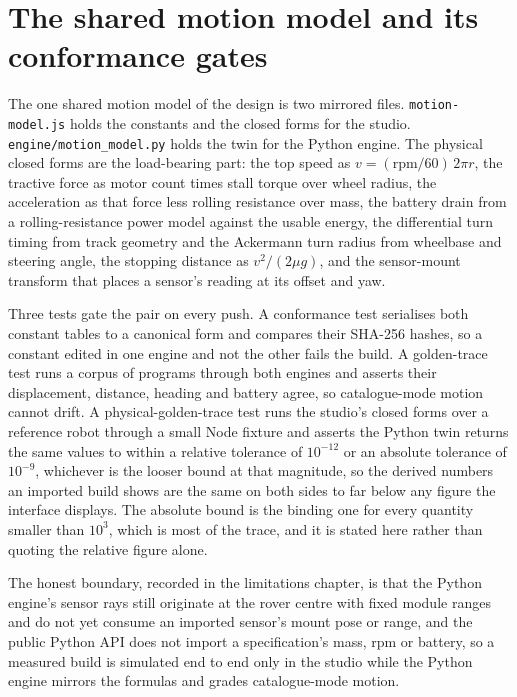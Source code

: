 \documentclass[11pt,a4paper]{report}
\begin{document}
\section{The shared motion model and its conformance gates}
\label{sec:conformance}
The one shared motion model of the design is two mirrored files. \texttt{motion-model.js} holds the constants and the closed forms for the studio. \texttt{engine/motion\_model.py} holds the twin for the Python engine. The physical closed forms are the load-bearing part: the top speed as $v = (\mathrm{rpm}/60)\,2\pi r$, the tractive force as motor count times stall torque over wheel radius, the acceleration as that force less rolling resistance over mass, the battery drain from a rolling-resistance power model against the usable energy, the differential turn timing from track geometry and the Ackermann turn radius from wheelbase and steering angle, the stopping distance as $v^2/(2\mu g)$, and the sensor-mount transform that places a sensor's reading at its offset and yaw.

Three tests gate the pair on every push. A conformance test serialises both constant tables to a canonical form and compares their SHA-256 hashes, so a constant edited in one engine and not the other fails the build. A golden-trace test runs a corpus of programs through both engines and asserts their displacement, distance, heading and battery agree, so catalogue-mode motion cannot drift. A physical-golden-trace test runs the studio's closed forms over a reference robot through a small Node fixture and asserts the Python twin returns the same values to within a relative tolerance of \(10^{-12}\) or an absolute tolerance of \(10^{-9}\), whichever is the looser bound at that magnitude, so the derived numbers an imported build shows are the same on both sides to far below any figure the interface displays. The absolute bound is the binding one for every quantity smaller than \(10^{3}\), which is most of the trace, and it is stated here rather than quoting the relative figure alone.

The honest boundary, recorded in the limitations chapter, is that the Python engine's sensor rays still originate at the rover centre with fixed module ranges and do not yet consume an imported sensor's mount pose or range, and the public Python API does not import a specification's mass, rpm or battery, so a measured build is simulated end to end only in the studio while the Python engine mirrors the formulas and grades catalogue-mode motion.
\end{document}
